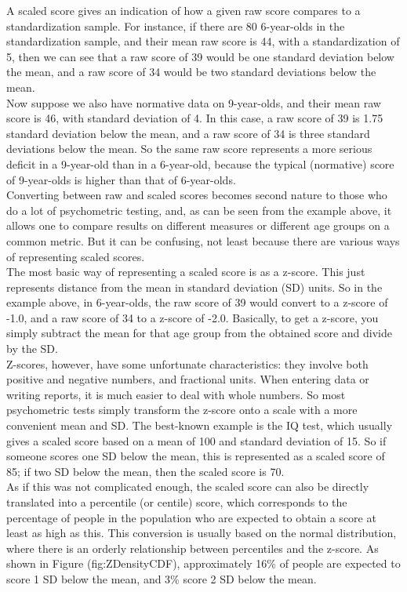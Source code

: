 \begin{tcolorbox}[enhanced, breakable,colback=Black!5!lightgray,colframe=black!75!black,coltitle=white,title=How scaled scores are derived]
A scaled score gives an indication of how a given raw score compares to a standardization sample. For instance, if there are 80 6-year-olds in the standardization sample, and their mean raw score is 44, with a standardization of 5, then we can see that a raw score of 39 would be one standard deviation below the mean, and a raw score of 34 would be two standard deviations below the mean.\\
Now suppose we also have normative data on 9-year-olds, and their mean raw score is 46, with standard deviation of 4. In this case, a raw score of 39 is 1.75 standard deviation below the mean, and a raw score of 34 is three standard deviations below the mean. So the same raw score represents a more serious deficit in a 9-year-old than in a 6-year-old, because the typical (normative) score of 9-year-olds is higher than that of 6-year-olds.\\
Converting between raw and scaled scores becomes second nature to those who do a lot of psychometric testing, and, as can be seen from the example above, it allows one to compare results on different measures or different age groups on a common metric. But it can be confusing, not least because there are various ways of representing scaled scores.\\
The most basic way of representing a scaled score is as a z-score. This just represents distance from the mean in standard deviation (SD) units. So in the example above, in 6-year-olds, the raw score of 39 would convert to a z-score of -1.0, and a raw score of 34 to a z-score of -2.0. Basically, to get a z-score, you simply subtract the mean for that age group from the obtained score and divide by the SD.\\
Z-scores, however, have some unfortunate characteristics: they involve both positive and negative numbers, and fractional units. When entering data or writing reports, it is much easier to deal with whole numbers. So most psychometric tests simply transform the z-score onto a scale with a more convenient mean and SD. The best-known example is the IQ test, which usually gives a scaled score based on a mean of 100 and standard deviation of 15. So if someone scores one SD below the mean, this is represented as a scaled score of 85; if two SD below the mean, then the scaled score is 70.\\
As if this was not complicated enough, the scaled score can also be directly translated into a percentile (or centile) score, which corresponds to the percentage of people in the population who are expected to obtain a score at least as high as this. This conversion is usually based on the normal distribution, where there is an orderly relationship between percentiles and the z-score. As shown in Figure \@ref(fig:ZDensityCDF), approximately 16\% of people are expected to score 1 SD below the mean, and 3\% score 2 SD below the mean.



\end{tcolorbox}
